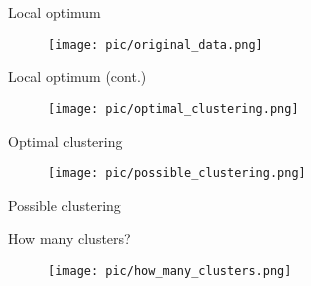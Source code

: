 \documentclass[serif, aspectratio=169]{beamer}
\begin{document}
\begin{frame}{Local optimum}
    \begin{itemize}
        \begin{figure}
            \centering
            \texttt{[image: pic/original\_data.png]}
        \end{figure}
    \end{itemize}
\end{frame}
\begin{frame}{Local optimum (cont.)}
    \begin{minipage}{0.5\textwidth}
        \begin{figure}
            \centering
            \texttt{[image: pic/optimal\_clustering.png]}
        \end{figure}
        \vfill
        \begin{center}
            Optimal clustering
        \end{center}
    \end{minipage}%
    \begin{minipage}{0.5\textwidth}
        \begin{figure}
            \centering
            \texttt{[image: pic/possible\_clustering.png]}
        \end{figure}
        \vfill
        \begin{center}
            Possible clustering
        \end{center}
    \end{minipage}
\end{frame}


\begin{frame}{How many clusters?}
    \begin{figure}
        \centering
        \texttt{[image: pic/how\_many\_clusters.png]}
    \end{figure}
\end{frame}
\end{document}
